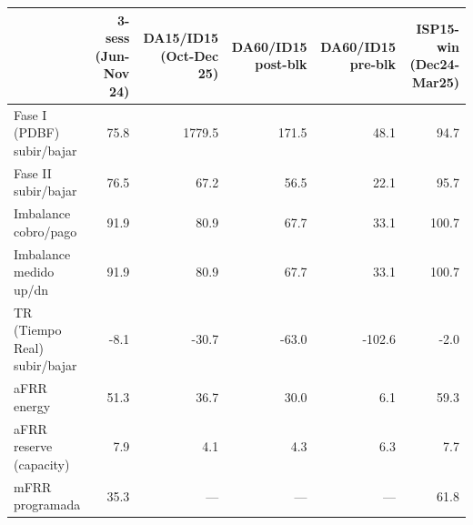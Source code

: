 \begin{tabular}{lrrrrr}
\toprule
 & 3-sess (Jun-Nov 24) & DA15/ID15 (Oct-Dec 25) & DA60/ID15 post-blk & DA60/ID15 pre-blk & ISP15-win (Dec24-Mar25) \\
\midrule
Fase I (PDBF) subir/bajar & 75.8 & 1779.5 & 171.5 & 48.1 & 94.7 \\
Fase II subir/bajar & 76.5 & 67.2 & 56.5 & 22.1 & 95.7 \\
Imbalance cobro/pago & 91.9 & 80.9 & 67.7 & 33.1 & 100.7 \\
Imbalance medido up/dn & 91.9 & 80.9 & 67.7 & 33.1 & 100.7 \\
TR (Tiempo Real) subir/bajar & -8.1 & -30.7 & -63.0 & -102.6 & -2.0 \\
aFRR energy & 51.3 & 36.7 & 30.0 & 6.1 & 59.3 \\
aFRR reserve (capacity) & 7.9 & 4.1 & 4.3 & 6.3 & 7.7 \\
mFRR programada & 35.3 & --- & --- & --- & 61.8 \\
\bottomrule
\end{tabular}
